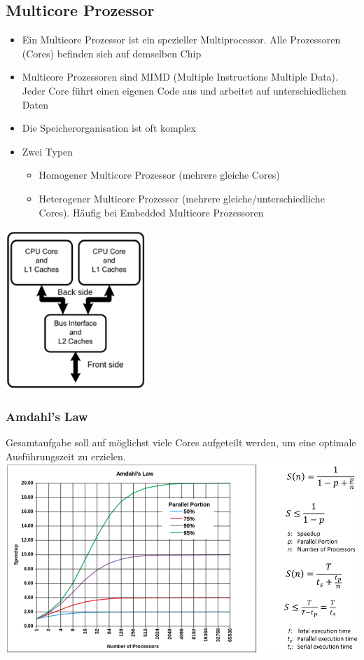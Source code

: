 \subsection{Multicore Prozessor}
\begin{multicols}{2}
	\begin{itemize}
		\item Ein Multicore Prozessor ist ein spezieller Multiprocessor. Alle Prozessoren (Cores) befinden sich auf demselben Chip
		\item  Multicore Prozessoren sind MIMD (Multiple Instructions Multiple Data). Jeder Core führt einen eigenen Code aus und arbeitet auf unterschiedlichen Daten
		\item Die Speicherorganisation ist oft komplex
		\item Zwei Typen
		\begin{itemize}
			\item Homogener Multicore Prozessor (mehrere gleiche Cores)
			\item Heterogener Multicore Prozessor (mehrere gleiche/unterschiedliche Cores). Häufig bei Embedded Multicore Prozessoren
		\end{itemize}
	\end{itemize}
\columnbreak
	\includegraphics[width=0.4\textwidth]{images/Multicore/Multicore}
\end{multicols}

\subsubsection{Amdahl's Law}
Gesamtaufgabe soll auf möglichst viele Cores aufgeteilt werden, um eine optimale Ausführungszeit zu erzielen. \\
\includegraphics[width=1\textwidth]{images/Multicore/amdahl}

